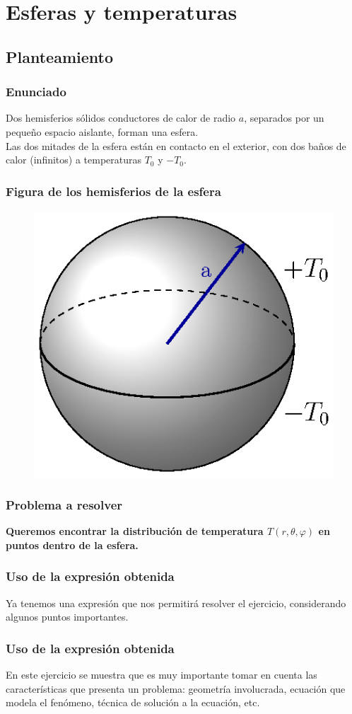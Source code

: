 \documentclass[12pt]{beamer}
\begin{document}
\section{Esferas y temperaturas}
\subsection{Planteamiento}

\begin{frame}
\frametitle{Enunciado}
Dos hemisferios sólidos conductores de calor de radio $a$, separados por un pequeño espacio aislante, forman una esfera.
\\
\bigskip
\pause
Las dos mitades de la esfera están en contacto en el exterior, con dos baños de calor (infinitos) a temperaturas $T_{0}$ y $-T_{0}$.
\end{frame}
\begin{frame}
\frametitle{Figura de los hemisferios de la esfera}
\begin{figure}[H]
    \centering
    \includegraphics[scale=1.2]{Imagenes/Ejemplo_Esfera_01.eps}
\end{figure}
\end{frame}
\begin{frame}
\frametitle{Problema a resolver}
\textbf{Queremos encontrar la distribución de temperatura $T (r, \theta, \varphi)$ en puntos dentro de la esfera.}
\end{frame}
\begin{frame}
\frametitle{Uso de la expresión obtenida}
Ya tenemos una expresión que nos permitirá resolver el ejercicio, considerando algunos puntos importantes.
\end{frame}
\begin{frame}
\frametitle{Uso de la expresión obtenida}
En este ejercicio se muestra que es muy importante tomar en cuenta las características que presenta un problema: geometría involucrada, ecuación que modela el fenómeno, técnica de solución a la ecuación, etc.
\end{frame}
\end{document}
